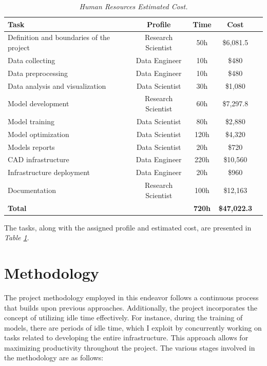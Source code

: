 \newpage

\begin{table}[H]
\centering
\begin{tabular}{lcccc}
	 \toprule
\textbf{Task} & \textbf{Profile} & \textbf{Time} & \textbf{Cost} \\
		\midrule
    Definition and boundaries of the project & Research Scientist & 50h & \$6,081.5\\
    Data collecting & Data Engineer & 10h & \$480\\
    Data preprocessing & Data Engineer & 10h & \$480 \\
    Data analysis and visualization & Data Scientist & 30h & \$1,080\\
    Model development & Research Scientist & 60h & \$7,297.8 \\
    Model training & Data Scientist & 80h & \$2,880 \\
    Model optimization & Data Scientist & 120h & \$4,320 \\
    Models reports & Data Scientist & 20h & \$720 \\
    CAD infrastructure & Data Engineer & 220h & \$10,560 \\
    Infrastructure deployment & Data Engineer & 20h & \$960 \\
    Documentation & Research Scientist & 100h & \$12,163 \\
		\midrule
    \textbf{Total} &    &  \textbf{720h} & \textbf{\$47,022.3} \\
    \bottomrule
\end{tabular}
\caption[Human Resources Estimated Cost.]{\textit{Human Resources Estimated Cost.}}
{\label{table:human_resources_cost}}
\end{table}

The tasks, along with the assigned profile and estimated cost, are presented in \textit{Table \ref{table:human_resources_cost}}. \\

\section{Methodology}

The project methodology employed in this endeavor follows a continuous process that builds upon previous approaches. Additionally, the project incorporates the concept of utilizing idle time effectively. For instance, during the training of models, there are periods of idle time, which I exploit by concurrently working on tasks related to developing the entire infrastructure. This approach allows for maximizing productivity throughout the project. The various stages involved in the methodology are as follows: \\

